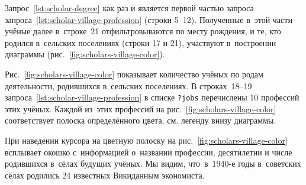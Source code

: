 Запрос~\ref{lst:scholar-degree} как раз и является 
первой частью запроса запроса~\ref{lst:scholar-village-profession} (строки 5--12). 
Полученные в~этой части учёные далее в~строке~21 
отфильтровываются по месту рождения, и те, кто родился в~сельских поселениях (строки 17 и 21), 
участвуют в~построении диаграммы (рис.~\ref{fig:scholars-village-color}).


Рис.~\ref{fig:scholars-village-color} показывает количество учёных по родам деятельности, 
родившихся в~сельских поселениях. 
В строках~18--19 запроса~\ref{lst:scholar-village-profession} 
в списке \lstinline|?jobs| перечислены 10 профессий этих учёных. 
%
% 
%
Каждой из~этих профессий на рис.~\ref{fig:scholars-village-color} 
соответствует полоска определённого цвета, см. легенду внизу диаграммы. 

При наведении курсора на цветную полоску на рис.~\ref{fig:scholars-village-color} 
всплывает окошко с~информацией о~названии профессии, десятилетии и числе родившихся в~сёлах будущих учёных. 
Мы видим, что~в~1940-е годы в~советских сёлах родились 24 известных Викиданным экономиста.%

